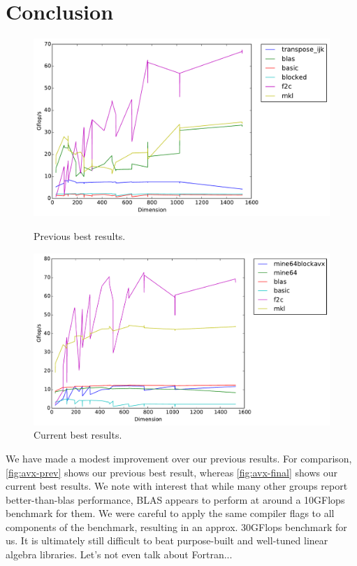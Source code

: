 \documentclass{scrartcl}
\begin{document}
  \section{Conclusion}
  \begin{figure}[ht!]
    \centering

    \includegraphics[width=\textwidth]{timing-current-best}
    \caption{Previous best results.\label{fig:avx-prev}}

    \includegraphics[width=\textwidth]{timing-final-best}
    \caption{Current best results.\label{fig:avx-final}}
  \end{figure}
  We have made a modest improvement over our previous results. For comparison, \autoref{fig:avx-prev} shows our previous best result, whereas \autoref{fig:avx-final} shows our current best results. We note with interest that while many other groups report better-than-blas performance, BLAS appears to perform at around a 10GFlops benchmark for them. We were careful to apply the same compiler flags to all components of the benchmark, resulting in an approx. 30GFlops benchmark for us. It is ultimately still difficult to beat purpose-built and well-tuned linear algebra libraries. Let's not even talk about Fortran...
\end{document}
